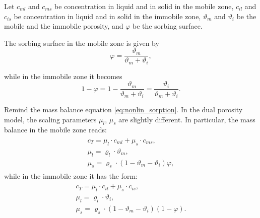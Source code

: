 Let $c_{ml}$ and $c_{ms}$ be concentration in liquid and in solid in the mobile zone, 
$c_{il}$ and $c_{is}$ be concentration in liquid and in solid in the immobile zone,
$\vartheta_m$ and $\vartheta_i$ be the mobile and the immobile porosity,
and $\varphi$ be the sorbing surface.

The sorbing surface in the mobile zone is given by
\begin{equation}
  \varphi = \frac{\vartheta_m}{\vartheta_m + \vartheta_i}, 
\end{equation}

while in the immobile zone it becomes
\[ 1 - \varphi = 1-\frac{\vartheta_m}{\vartheta_m + \vartheta_i} = \frac{\vartheta_i}{\vartheta_m + \vartheta_i}. \]

Remind the mass balance equation \eqref{eq:nonlin_sorption}.
In the dual porosity model, the scaling parameters $\mu_l$, $\mu_s$ are slightly different.
In particular, the mass balance in the mobile zone reads:
\begin{eqnarray}
 \begin{array}{l}
  c_T = \mu_l\cdot c_{ml} + \mu_s\cdot c_{ms},\\
  \mu_l = \varrho_l \cdot \vartheta_m, \\
  \mu_s = \varrho_s\cdot(1-\vartheta_m - \vartheta_i)\varphi,
 \end{array}
 \label{eq:scale_params_m}
\end{eqnarray}
while in the immobile zone it has the form:
\begin{eqnarray}
 \begin{array}{l}
  c_T = \mu_l\cdot c_{il} + \mu_s\cdot c_{is},\\
  \mu_l = \varrho_l \cdot \vartheta_i, \\
  \mu_s = \varrho_s\cdot(1-\vartheta_m - \vartheta_i)(1 - \varphi).
 \end{array}
 \label{eq:scale_params_i}
\end{eqnarray}
